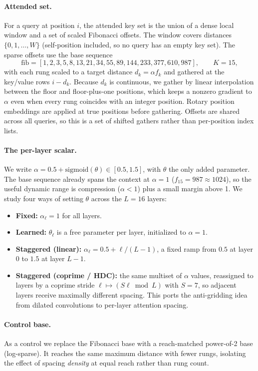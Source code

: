 \documentclass[11pt]{article}
\begin{document}
\paragraph{Attended set.}
For a query at position $i$, the attended key set is the union of a dense local
window and a set of scaled Fibonacci offsets. The window covers distances
$\{0,1,\dots,W\}$ (self-position included, so no query has an empty key set).
The sparse offsets use the base sequence
\[
\mathrm{fib} = [1,2,3,5,8,13,21,34,55,89,144,233,377,610,987],\qquad K=15,
\]
with each rung scaled to a target distance $d_k = \alpha f_k$ and gathered at the
key/value rows $i - d_k$. Because $d_k$ is continuous, we gather by linear
interpolation between the floor and floor-plus-one positions, which keeps a
nonzero gradient to $\alpha$ even when every rung coincides with an integer position. Rotary
position embeddings are applied at true positions before gathering. Offsets are
shared across all queries, so this is a set of shifted gathers rather than
per-position index lists.

\paragraph{The per-layer scalar.}
We write $\alpha = 0.5 + \mathrm{sigmoid}(\theta) \in [0.5, 1.5]$, with $\theta$
the only added parameter. The base sequence already spans the context at
$\alpha=1$ ($f_{15}=987 \approx 1024$), so the useful dynamic range is
compression ($\alpha<1$) plus a small margin above 1. We study four ways of
setting $\theta$ across the $L=16$ layers:
\begin{itemize}
\item \textbf{Fixed:} $\alpha_\ell = 1$ for all layers.
\item \textbf{Learned:} $\theta_\ell$ is a free parameter per layer, initialized
to $\alpha=1$.
\item \textbf{Staggered (linear):} $\alpha_\ell = 0.5 + \ell/(L-1)$, a fixed ramp
from $0.5$ at layer $0$ to $1.5$ at layer $L-1$.
\item \textbf{Staggered (coprime / HDC):} the same multiset of $\alpha$ values,
reassigned to layers by a coprime stride $\ell \mapsto (S\ell \bmod L)$ with
$S=7$, so adjacent layers receive maximally different spacing. This ports the
anti-gridding idea from dilated convolutions \citep{wang2018understanding} to
per-layer attention spacing.
\end{itemize}

\paragraph{Control base.}
As a control we replace the Fibonacci base with a reach-matched power-of-2 base
(log-sparse). It reaches the same maximum distance with fewer rungs, isolating
the effect of spacing \emph{density} at equal reach rather than rung count.
\end{document}
